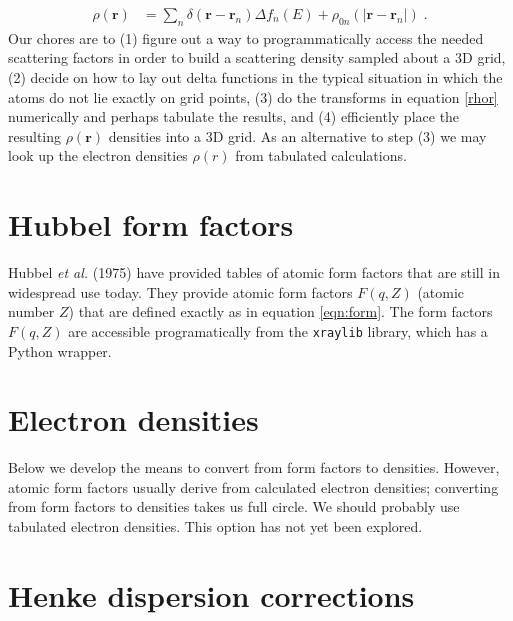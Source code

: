 \documentclass[11pt]{article}
\renewcommand{\vec}[1]{\boldsymbol{#1}}
\begin{document}
\begin{align}
\rho(\vec{r})  &= \sum_n \delta(\vec{r}-\vec{r}_n) \Delta f_n(E) + \rho_{0n}(|\vec{r}-\vec{r}_n|) \; .
\end{align}
Our chores are to (1) figure out a way to programmatically access the needed scattering factors in order to build a scattering density sampled about a 3D grid, (2) decide on how to lay out delta functions in the typical situation in which the atoms do not lie exactly on grid points, (3) do the transforms in equation \ref{rhor} numerically and perhaps tabulate the results, and (4) efficiently place the resulting $\rho(\vec{r})$ densities into a 3D grid.  As an alternative to step (3) we may look up the electron densities $\rho(r)$ from tabulated calculations.


\section{Hubbel form factors}

Hubbel {\itshape et al.} (1975)\cite{hubbellAtomicFormFactors1975} have provided tables of atomic form factors that are still in widespread use today.  They provide atomic form factors $F(q,Z)$ (atomic number $Z$) that are defined exactly as in equation \ref{eqn:form}.
The form factors $F(q,Z)$ are accessible programatically from the  \texttt{xraylib} library, which has a Python wrapper.

\section{Electron densities}

Below we develop the means to convert from form factors to densities.  However, atomic form factors usually derive from calculated electron densities; converting from form factors to densities takes us full circle.  We should probably use tabulated electron densities\cite{kogaAnalyticalHartreeFockElectron1996}.  This option has not yet been explored.

\section{Henke dispersion corrections} 
\end{document}
